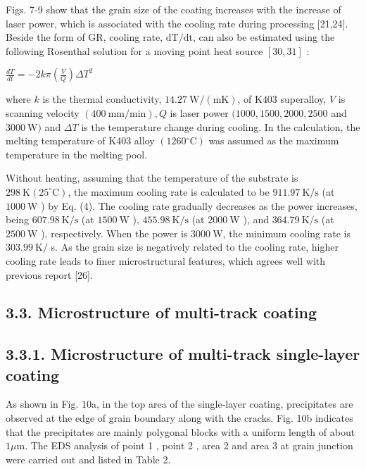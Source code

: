 \documentclass[10pt]{article}
\begin{document}
Figs. 7-9 show that the grain size of the coating increases with the increase of laser power, which is associated with the cooling rate during processing [21,24]. Beside the form of GR, cooling rate, $\mathrm{dT} / \mathrm{dt}$, can also be estimated using the following Rosenthal solution for a moving point heat source $[30,31]$ :

$\frac{d T}{d t}=-2 k \pi\left(\frac{V}{Q}\right) \Delta T^{2}$

where $k$ is the thermal conductivity, $14.27 \mathrm{~W} /(\mathrm{mK})$, of $\mathrm{K} 403$ superalloy, $V$ is scanning velocity $(400 \mathrm{~mm} / \mathrm{min}), Q$ is laser power $(1000,1500,2000,2500$ and $3000 \mathrm{~W})$ and $\Delta T$ is the temperature change during cooling. In the calculation, the melting temperature of K403 alloy $\left(1260{ }^{\circ} \mathrm{C}\right)$ was assumed as the maximum temperature in the melting pool.

Without heating, assuming that the temperature of the substrate is $298 \mathrm{~K}\left(25^{\circ} \mathrm{C}\right)$, the maximum cooling rate is calculated to be $911.97 \mathrm{~K} / \mathrm{s}$ (at $1000 \mathrm{~W}$ ) by Eq. (4). The cooling rate gradually decreases as the power increases, being $607.98 \mathrm{~K} / \mathrm{s}$ (at $1500 \mathrm{~W}$ ), $455.98 \mathrm{~K} / \mathrm{s}$ (at $2000 \mathrm{~W}$ ), and $364.79 \mathrm{~K} / \mathrm{s}$ (at $2500 \mathrm{~W}$ ), respectively. When the power is $3000 \mathrm{~W}$, the minimum cooling rate is $303.99 \mathrm{~K} /$ s. As the grain size is negatively related to the cooling rate, higher cooling rate leads to finer microstructural features, which agrees well with previous report [26].

\subsection*{3.3. Microstructure of multi-track coating}
\subsection*{3.3.1. Microstructure of multi-track single-layer coating}
As shown in Fig. 10a, in the top area of the single-layer coating, precipitates are observed at the edge of grain boundary along with the cracks. Fig. 10b indicates that the precipitates are mainly polygonal blocks with a uniform length of about $1 \mu \mathrm{m}$. The EDS analysis of point 1 , point 2 , area 2 and area 3 at grain junction were carried out and listed in Table 2.
\end{document}
